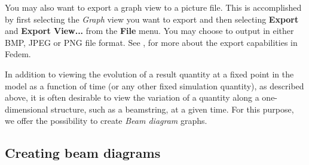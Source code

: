 You may also want to export a graph view to a picture file.
This is accomplished by first selecting the {\sl Graph} view you want to export
and then selecting \textbf{Export} and \textbf{Export View...} from the
\textbf{File} menu. You may choose to output in either BMP, JPEG or PNG file
format. See ,
for more about the export capabilities in Fedem.





In addition to viewing the evolution of a result quantity at a fixed point in
the model as a function of time (or any other fixed simulation quantity),
as described above, it is often desirable to view the variation of a quantity
along a one-dimensional structure, such as a beamstring, at a given time.
For this purpose, we offer the possibility to create {\sl Beam diagram} graphs.


\subsection{Creating beam diagrams}



